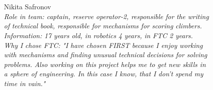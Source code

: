 \begin{figure}[H]
	\begin{minipage}[h]{0.47\linewidth}
		\\
	\end{minipage}
	\vfill
	\begin{minipage}{0.47\linewidth}
		\\
	\end{minipage}
	\hfill
	\begin{minipage}{0.47\linewidth}
		Nikita Safronov\\
		\emph{Role in team: captain, reserve operator-2, responsible for the writing of technical book, responsible for mechanisms for scoring climbers.\\}
		\emph{Information: 17 years old, in robotics 4 years, in FTC 2 years.\\} 
		\emph{Why I chose FTC: "I have chosen FIRST because I enjoy working with mechanisms and finding unusual technical decisions for solving problems. Also working on this project helps me to get new skills in a sphere of engineering. In this case I know, that I don't spend my time in vain."}				
	\end{minipage}
\end{figure}

